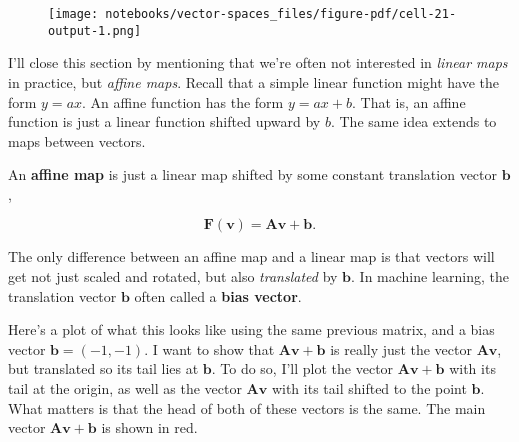 \documentclass[
  letterpaper,
  DIV=11,
  numbers=noendperiod]{scrreprt}
\begin{document}
\begin{figure}[H]

{\centering \texttt{[image: notebooks/vector-spaces\_files/figure-pdf/cell-21-output-1.png]}

}

\end{figure}

I'll close this section by mentioning that we're often not interested in
\emph{linear maps} in practice, but \emph{affine maps}. Recall that a
simple linear function might have the form \(y=ax\). An affine function
has the form \(y=ax+b\). That is, an affine function is just a linear
function shifted upward by \(b\). The same idea extends to maps between
vectors.

An \textbf{affine map} is just a linear map shifted by some constant
translation vector \(\mathbf{b}\),

\[\mathbf{F}(\mathbf{v}) = \mathbf{A}\mathbf{v} + \mathbf{b}.\]

The only difference between an affine map and a linear map is that
vectors will get not just scaled and rotated, but also \emph{translated}
by \(\mathbf{b}\). In machine learning, the translation vector
\(\mathbf{b}\) often called a \textbf{bias vector}.

Here's a plot of what this looks like using the same previous matrix,
and a bias vector \(\mathbf{b}=(-1, -1)\). I want to show that
\(\mathbf{A}\mathbf{v} + \mathbf{b}\) is really just the vector
\(\mathbf{A}\mathbf{v}\), but translated so its tail lies at
\(\mathbf{b}\). To do so, I'll plot the vector
\(\mathbf{A}\mathbf{v} + \mathbf{b}\) with its tail at the origin, as
well as the vector \(\mathbf{A}\mathbf{v}\) with its tail shifted to the
point \(\mathbf{b}\). What matters is that the head of both of these
vectors is the same. The main vector
\(\mathbf{A}\mathbf{v} + \mathbf{b}\) is shown in red.
\end{document}

